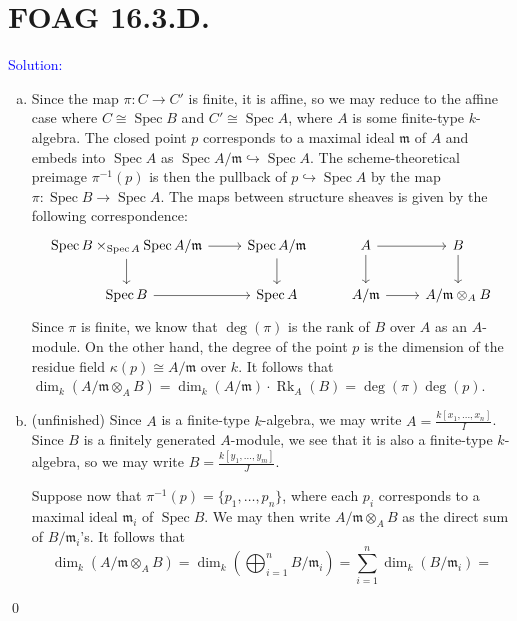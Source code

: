 \documentclass[11pt]{article}
\newcommand{\km}{\mathfrak{m}}
\DeclareMathOperator{\Spec}{\operatorname{Spec}}
\newcommand{\Rk}{\operatorname{Rk}}
\newenvironment{solution}{\begin{trivlist}\item[]{\textcolor{blue}{Solution:}}}{\qed \end{trivlist}}
\begin{document}
\newpage

\section*{FOAG 16.3.D.}

\begin{solution}
\begin{enumerate}[(a)]
	\item Since the map $\pi: C \rightarrow C'$ is finite, it is affine, so we may reduce to the affine case where $C \cong \Spec B$ and $C' \cong \Spec A$, where $A$ is some finite-type $k$-algebra. The closed point $p$ corresponds to a maximal ideal $\km$ of $A$ and embeds into $\Spec A$ as $\Spec A/\km \hookrightarrow \Spec A$. The scheme-theoretical preimage $\pi^{-1}(p)$ is then the pullback of $p \hookrightarrow \Spec A$ by the map $\pi: \Spec B \rightarrow \Spec A$. The maps between structure sheaves is given by the following correspondence:
	\[\begin{tikzcd}
		{\Spec B \times_{\Spec A} \Spec A/\km} & {\Spec A/\km} & A & B \\
		{\Spec B} & {\Spec A} & {A/\km} & {A/\km \otimes_A B}
		\arrow[from=1-1, to=1-2]
		\arrow[from=1-1, to=2-1]
		\arrow[from=1-2, to=2-2]
		\arrow[from=1-3, to=1-4]
		\arrow[from=1-3, to=2-3]
		\arrow[from=1-4, to=2-4]
		\arrow[from=2-1, to=2-2]
		\arrow[from=2-3, to=2-4]
	\end{tikzcd}\]
	Since $\pi$ is finite, we know that $\deg(\pi)$ is the rank of $B$ over $A$ as an $A$-module. On the other hand, the degree of the point $p$ is the dimension of the residue field $\kappa(p) \cong A/\km$ over $k$. It follows that $\dim_k(A/\km \otimes_A B) = \dim_k(A/\km) \cdot \Rk_A(B) = \deg(\pi) \deg(p)$. 

	\item (unfinished) Since $A$ is a finite-type $k$-algebra, we may write $A = \frac{k[x_1, \ldots, x_n]}{I}$. Since $B$ is a finitely generated $A$-module, we see that it is also a finite-type $k$-algebra, so we may write $B = \frac{k[y_1, \ldots, y_m]}{J}$. 
	
	Suppose now that $\pi^{-1}(p) = \{p_1, \ldots, p_n\}$, where each $p_i$ corresponds to a maximal ideal $\km_i$ of $\Spec B$. We may then write $A / \km \otimes_A B$ as the direct sum of $B / \km_i$'s. It follows that 
	\begin{equation*}
		\dim_{k} \left( A / \km \otimes_A B \right)
		= \dim_k \left( \bigoplus_{i=1}^n B / \km_i \right)
		= \sum_{i=1}^n \dim_k (B / \km_i) 
		= 
	\end{equation*}
\end{enumerate}
\end{solution}
\end{document}
